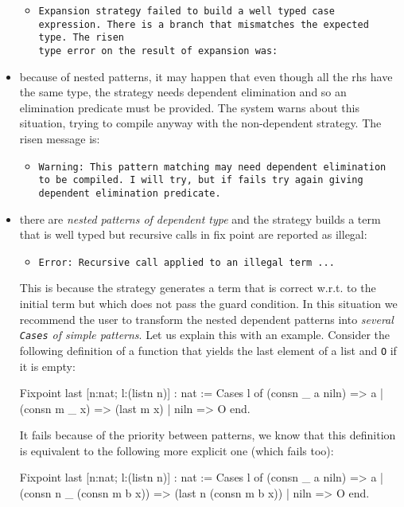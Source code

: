 \begin{itemize}
  \begin{itemize}
  \item {\tt Expansion strategy failed to build a well typed case
      expression.  There is a branch that mismatches the expected
      type.  The risen \\ type error on the result of expansion was:}
  \end{itemize}
  
\item because of nested patterns, it may happen that even though all
  the rhs have the same type, the strategy needs dependent elimination
  and so an elimination predicate must be provided. The system warns
  about this situation, trying to compile anyway with the
  non-dependent strategy. The risen message is:
\begin{itemize}
\item {\tt Warning: This pattern matching may need dependent
    elimination to be compiled.  I will try, but if fails try again
    giving dependent elimination predicate.}
\end{itemize}

\item there are {\em nested patterns of dependent type} and the
  strategy builds a term that is well typed but recursive calls in fix
  point are reported as illegal:
\begin{itemize}
\item {\tt Error: Recursive call applied to an illegal term ...}
\end{itemize}

This is because the strategy generates a term that is correct w.r.t.
to the initial term but which does not pass the guard condition.  In
this situation we recommend the user to transform the nested dependent
patterns into {\em several \texttt{Cases} of simple patterns}.  Let us
explain this with an example.  Consider the following definition of a
function that yields the last element of a list and \texttt{O} if it is
empty:

\begin{coq_example}
  Fixpoint last [n:nat; l:(listn n)] : nat :=
   Cases l of 
     (consn _ a niln) => a
   | (consn m _ x) => (last m x) | niln => O
   end.
\end{coq_example}

It fails because of the priority between patterns, we know that this
definition is equivalent to the following more explicit one (which
fails too):

\begin{coq_example*}
  Fixpoint last [n:nat; l:(listn n)] : nat :=
   Cases l of
     (consn _ a niln) => a
   | (consn n _ (consn m b x)) => (last n (consn m b x))
   | niln => O
   end.
\end{coq_example*}


\end{itemize}
